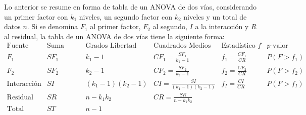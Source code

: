 Lo anterior se resume en forma de tabla de un ANOVA de dos vías, considerando un primer factor con $k_1$ niveles, un
segundo factor con $k_2$ niveles y un total de datos $n$. Si se denomina $F_1$ al primer factor, $F_2$ al segundo, $I$ a
la interacción y $R$ al residual, la tabla de un ANOVA de dos vías tiene la siguiente forma:
\[
\renewcommand{\arraystretch}{2}
\begin{array}{cccccc}
\hline
\text{Fuente} & \text{Suma Cuadrados} & \text {Grados Libertad} & \text{Cuadrados Medios} & \text{Estadístico $f$} & \text{$p$-valor}\\
\hline
F_1 & SF_1 & k_1-1 & CF_1=\frac{SF_1}{k_1-1} & f_1=\frac{CF_1}{CR} & P(F>f_1) \\
F_2 & SF_2 & k_2-1 & CF_2=\frac{SF_2}{k_2-1} & f_2=\frac{CF_2}{CR} & P(F>f_2) \\
\text{Interacción} & SI & (k_1-1)(k_2-1) & CI=\frac{SI}{(k_1-1)(k_2-1)} & f_I=\frac{CI}{CR} & P(F>f_I) \\
\text{Residual} & SR & n-k_1k_2 & CR=\frac{SR}{n-k_1k_2} &  &  \\
\hline
\text{Total} & ST & n-1 &  &  & 
\end{array}
\]

